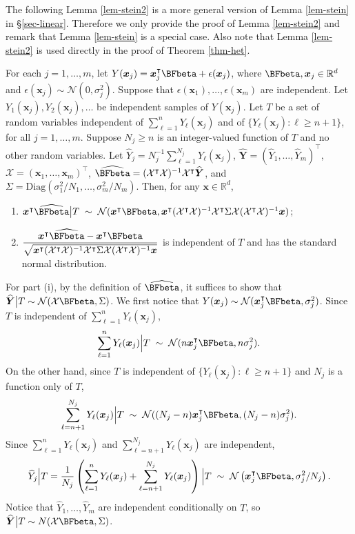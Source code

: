 \documentclass[ijoc,nonblindrev]{informs3}
\def\bx{{\bm x}}
\def\bY{{\bm Y}}
\def\cN{{\mathcal N}}
\def\cX{{\mathcal X}}
\begin{document}
The following Lemma \ref{lem-stein2} is a more general version of Lemma \ref{lem-stein} in \S \ref{sec-linear}.
Therefore we only provide the proof of Lemma \ref{lem-stein2} and remark that Lemma \ref{lem-stein} is a special case.
Also note that Lemma \ref{lem-stein2} is used directly in the proof of Theorem \ref{thm-het}.

\begin{lemma}  \label{lem-stein2}
For each $j=1,\ldots,m$, let $Y(\bx_j) = \bx_j^\intercal \BFbeta + \epsilon(\bx_j)$, where $\BFbeta, \bx_j \in \mathbb{R}^{d}$ and  $\epsilon(\bx_j) \sim \cN(0,\sigma_{j}^2)$.
Suppose that $\epsilon(\bx_1), \ldots, \epsilon(\bx_m)$ are independent. Let $Y_{1}(\bx_j), Y_{2}(\bx_j), \ldots$ be independent samples of $Y(\bx_j)$.
Let $T$ be a set of random variables independent of $\sum_{\ell=1}^n  Y_{\ell}(\bx_j)$ and of $\{Y_\ell(\bx_j):\ell\geq n+1\}$, for all $j=1,\ldots,m$.
Suppose $N_j\geq n$ is  an integer-valued function of $T$ and no other random variables.
Let $\widehat{Y}_j =N_j^{-1} \sum_{\ell=1}^{N_j} Y_{\ell}(\bx_j)$, $\widehat{\bY} = (\widehat{Y}_1, \ldots, \widehat{Y}_m)^\intercal$, $\cX=(\bx_1, \ldots, \bx_m)^\intercal$,
$\widehat{\BFbeta} = (\cX^\intercal \cX)^{-1} \cX^\intercal \widehat{\bY}$, and $\Sigma = \mathrm{Diag}( \sigma_{1}^2/N_1, \ldots, \sigma_{m}^2/N_m )$.
Then, for any $\bx \in \mathbb{R}^d$,
\begin{enumerate}[label=(\roman*)]
\item
$\bx^\intercal \widehat{\BFbeta} \big| T \; \sim \; \cN(\bx^\intercal \BFbeta, \bx^\intercal (\cX^\intercal \cX)^{-1} \cX^\intercal \Sigma \cX (\cX^\intercal \cX)^{-1} \bx)$;
\item
\vspace{3pt}
$ \displaystyle \frac{\bx^\intercal \widehat{\BFbeta} - \bx^\intercal \BFbeta}{\sqrt{\bx^\intercal (\cX^\intercal \cX)^{-1} \cX^\intercal \Sigma \cX (\cX^\intercal \cX)^{-1} \bx}}$
is independent of $T$  and has the standard normal distribution.
\end{enumerate}
\end{lemma}



For part (i), by the definition of $\widehat{\BFbeta}$, it suffices to show that $\widehat{\bY} \big| T \sim \cN(\cX \BFbeta, \Sigma)$.
We first notice that $Y(\bx_j) \sim \cN(\bx_j^\intercal \BFbeta, \sigma_j^2)$. Since $T$ is independent of $\sum_{\ell=1}^n Y_{\ell}(\bx_j)$,
\[\sum_{\ell=1}^n Y_{\ell}(\bx_j) \Big|T\;\sim\; \cN(n \bx_j^\intercal \BFbeta, n \sigma_j^2).\]
On the other hand, since $T$ is independent of  $\{Y_\ell(\bx_j):\ell\geq n+1\}$ and $N_j$ is a function only of $T$,
\[\sum_{\ell=n+1}^{N_j} Y_{\ell}(\bx_j) \Big|T \;\sim\; \cN((N_j-n) \bx_j^\intercal \BFbeta, (N_j-n)\sigma_j^2).\]
Since $\sum_{\ell=1}^n Y_{\ell}(\bx_j)$ and $\sum_{\ell=n+1}^{N_j} Y_{\ell}(\bx_j)$ are independent,
\[\widehat{Y}_j \Big| T = \frac{1}{N_j} \left( \sum_{\ell=1}^{n} Y_{\ell}(\bx_j) + \sum_{\ell=n+1}^{N_j} Y_{\ell}(\bx_j) \right) \Big| T
\;\sim\; \cN \left(\bx_j^\intercal \BFbeta,  \sigma_j^2 /N_j\right).\]
Notice that  $\widehat{Y}_1, \ldots, \widehat{Y}_m$ are independent conditionally on $T$, so $\widehat{\bY}  \big| T \sim N(\cX \BFbeta, \Sigma)$.
\end{document}
